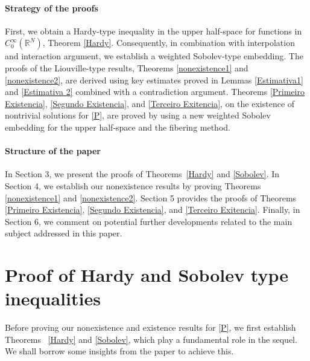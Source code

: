 \documentclass[12pt,reqno]{amsart}
\begin{document}
\paragraph{Strategy of the proofs}
First, we obtain a Hardy-type inequality in the upper half-space for functions in $C_0^\infty(\mathds{R}^N)$, Theorem \ref{Hardy}.
Consequently, in combination with interpolation and interaction argument, we establish a weighted Sobolev-type embedding.
The proofs of the Liouville-type results, Theorems \ref{nonexistence1} and \ref{nonexistence2}, are derived using key estimates proved in Lemmas \ref{Estimativa1} and \ref{Estimativa 2} combined with a contradiction argument.
Theorems \ref{Primeiro Existencia}, \ref{Segundo Existencia}, and \ref{Terceiro Exitencia}, on the existence of nontrivial solutions for \eqref{P}, are proved by using a new weighted Sobolev embedding for the upper half-space and the fibering method. 

\bigskip

\paragraph{Structure of the paper}
In Section 3, we present the proofs of Theorems~\ref{Hardy} and \ref{Sobolev}. 
In Section 4, we establish our nonexistence results by proving Theorems \ref{nonexistence1} and \ref{nonexistence2}. 
Section 5 provides the proofs of Theorems \ref{Primeiro Existencia}, \ref{Segundo Existencia}, and \ref{Terceiro Exitencia}. 
Finally, in Section 6, we comment on potential further developments related to the main subject addressed in this paper.



 
\section{Proof of Hardy and Sobolev type inequalities}
Before proving our nonexistence and existence results for \eqref{P}, we first establish Theorems ~\ref{Hardy} and \ref{Sobolev}, which play a fundamental role in the sequel. We shall borrow some insights from the paper \cite{MR4189791} to achieve this.
\end{document}
